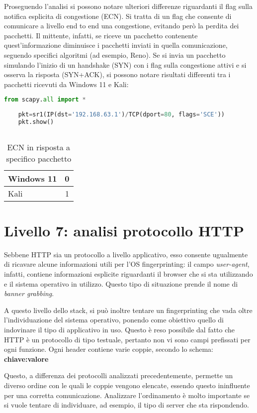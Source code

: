 Proseguendo l'analisi si possono notare ulteriori differenze riguardanti il flag sulla notifica esplicita di congestione (ECN). Si tratta di un flag che consente di comunicare a livello end to end una congestione, evitando però la perdita dei pacchetti. Il mittente, infatti, se riceve un pacchetto contenente quest'informazione diminuisce i pacchetti inviati in quella comunicazione, seguendo specifici algoritmi (ad esempio, Reno). 
Se si invia un pacchetto simulando l'inizio di un handshake (SYN) con i flag sulla congestione attivi e si osserva la risposta (SYN+ACK), si possono notare risultati differenti tra i pacchetti ricevuti da Windows 11 e Kali:
\\
\begin{lstlisting}[language=Python, caption={Comando Python per l'invio del pacchetto}]
	from scapy.all import *
	
	pkt=sr1(IP(dst='192.168.63.1')/TCP(dport=80, flags='SCE'))
	pkt.show()
	
\end{lstlisting}

\begin{table}[h]
	\centering
	\begin{tabular}{ l | c }
		\hline
		\rowcolor{blue!10} Windows 11 & 0
		\\
		\hline
		\rowcolor{red!10} Kali & 1
		\\
		\hline
		
	\end{tabular}
	\caption{ECN in risposta a specifico pacchetto}
	\label{tab:ECN}
\end{table}


\section{Livello 7: analisi protocollo HTTP}
Sebbene HTTP sia un protocollo a livello applicativo, esso consente ugualmente di ricavare alcune informazioni utili per l'OS fingerprinting: il campo \textit{user-agent}, infatti, contiene informazioni esplicite riguardanti il browser che si sta utilizzando e il sistema operativo in utilizzo. Questo tipo di situazione prende il nome di \textit{banner grabbing}.

A questo livello dello stack, si può inoltre tentare un fingerprinting che vada oltre l'individuazione del sistema operativo, ponendo come obiettivo quello di indovinare il tipo di applicativo in uso.
Questo è reso possibile dal fatto che HTTP è un protocollo di tipo testuale, pertanto non vi sono campi prefissati per ogni funzione. 
Ogni header contiene varie coppie, secondo lo schema:\\
\textbf{chiave:valore} 


Questo, a differenza dei protocolli analizzati precedentemente, permette un diverso ordine con le quali le coppie vengono elencate, essendo questo ininfluente per una corretta comunicazione. Analizzare l'ordinamento è molto importante se si vuole tentare di individuare, ad esempio, il tipo di server che sta rispondendo.






